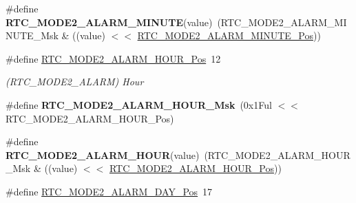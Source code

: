 \begin{DoxyCompactItemize}
\item 
\hypertarget{group___s_a_m_l21___r_t_c_ga7c804fa68e986cc902cd2a1fcb90f55f}{}\#define {\bfseries R\+T\+C\+\_\+\+M\+O\+D\+E2\+\_\+\+A\+L\+A\+R\+M\+\_\+\+M\+I\+N\+U\+T\+E}(value)~(R\+T\+C\+\_\+\+M\+O\+D\+E2\+\_\+\+A\+L\+A\+R\+M\+\_\+\+M\+I\+N\+U\+T\+E\+\_\+\+Msk \& ((value) $<$$<$ \hyperlink{group___s_a_m_l21___r_t_c_gad7ad89da3e48045de0a22785979dd782}{R\+T\+C\+\_\+\+M\+O\+D\+E2\+\_\+\+A\+L\+A\+R\+M\+\_\+\+M\+I\+N\+U\+T\+E\+\_\+\+Pos}))\label{group___s_a_m_l21___r_t_c_ga7c804fa68e986cc902cd2a1fcb90f55f}

\item 
\hypertarget{group___s_a_m_l21___r_t_c_gac68856cbe21e81780d25b920e33a199c}{}\#define \hyperlink{group___s_a_m_l21___r_t_c_gac68856cbe21e81780d25b920e33a199c}{R\+T\+C\+\_\+\+M\+O\+D\+E2\+\_\+\+A\+L\+A\+R\+M\+\_\+\+H\+O\+U\+R\+\_\+\+Pos}~12\label{group___s_a_m_l21___r_t_c_gac68856cbe21e81780d25b920e33a199c}

\begin{DoxyCompactList}\small\item\em (R\+T\+C\+\_\+\+M\+O\+D\+E2\+\_\+\+A\+L\+A\+R\+M) Hour \end{DoxyCompactList}\item 
\hypertarget{group___s_a_m_l21___r_t_c_ga3ed85524dba0c5b71ad3d6c8b51660da}{}\#define {\bfseries R\+T\+C\+\_\+\+M\+O\+D\+E2\+\_\+\+A\+L\+A\+R\+M\+\_\+\+H\+O\+U\+R\+\_\+\+Msk}~(0x1\+Ful $<$$<$ R\+T\+C\+\_\+\+M\+O\+D\+E2\+\_\+\+A\+L\+A\+R\+M\+\_\+\+H\+O\+U\+R\+\_\+\+Pos)\label{group___s_a_m_l21___r_t_c_ga3ed85524dba0c5b71ad3d6c8b51660da}

\item 
\hypertarget{group___s_a_m_l21___r_t_c_ga0c962db57806f976e66bfa43cda21b60}{}\#define {\bfseries R\+T\+C\+\_\+\+M\+O\+D\+E2\+\_\+\+A\+L\+A\+R\+M\+\_\+\+H\+O\+U\+R}(value)~(R\+T\+C\+\_\+\+M\+O\+D\+E2\+\_\+\+A\+L\+A\+R\+M\+\_\+\+H\+O\+U\+R\+\_\+\+Msk \& ((value) $<$$<$ \hyperlink{group___s_a_m_l21___r_t_c_gac68856cbe21e81780d25b920e33a199c}{R\+T\+C\+\_\+\+M\+O\+D\+E2\+\_\+\+A\+L\+A\+R\+M\+\_\+\+H\+O\+U\+R\+\_\+\+Pos}))\label{group___s_a_m_l21___r_t_c_ga0c962db57806f976e66bfa43cda21b60}

\item 
\hypertarget{group___s_a_m_l21___r_t_c_ga0a5e12490a836e5377314c4462de993c}{}\#define \hyperlink{group___s_a_m_l21___r_t_c_ga0a5e12490a836e5377314c4462de993c}{R\+T\+C\+\_\+\+M\+O\+D\+E2\+\_\+\+A\+L\+A\+R\+M\+\_\+\+D\+A\+Y\+\_\+\+Pos}~17\label{group___s_a_m_l21___r_t_c_ga0a5e12490a836e5377314c4462de993c}


\end{DoxyCompactItemize}
